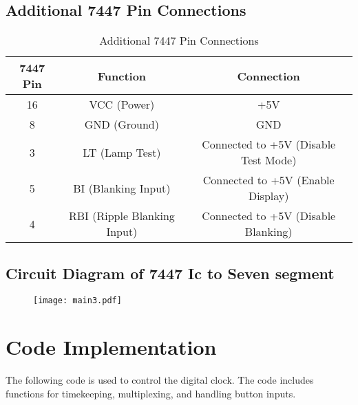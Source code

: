\documentclass[journal,12pt,onecolumn,article]{IEEEtran}
\theoremstyle{remark}
\begin{document}
\subsection*{Additional 7447 Pin Connections}

\begin{table}[H]
    \centering
    \renewcommand{\arraystretch}{1.2}
    \begin{tabular}{|c|c|c|}
        \hline
        \textbf{7447 Pin} & \textbf{Function} & \textbf{Connection} \\
        \hline
        16 & VCC (Power) & +5V \\
        8  & GND (Ground) & GND \\
        3  & LT (Lamp Test) & Connected to +5V (Disable Test Mode) \\
        5  & BI (Blanking Input) & Connected to +5V (Enable Display) \\
        4  & RBI (Ripple Blanking Input) & Connected to +5V (Disable Blanking) \\
        \hline
    \end{tabular}
    \caption{Additional 7447 Pin Connections}
    \label{tab:7447_additional}
\end{table}
\subsection*{Circuit Diagram of 7447 Ic to Seven segment}
\begin{figure}[H]
	\centering
	\texttt{[image: main3.pdf]}
	\label{Figure 2}
\end{figure}
\section{Code Implementation}
The following code is used to control the digital clock. The code includes functions for timekeeping, multiplexing, and handling button inputs.

\end{document}
